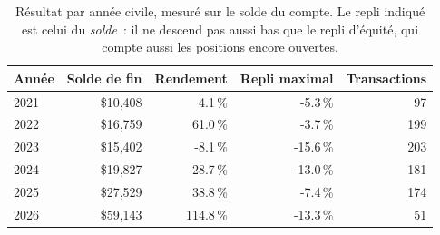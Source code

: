 \begin{table}[H]
\centering
\caption{Résultat par année civile, mesuré sur le solde du compte. Le repli indiqué est celui du \emph{solde}~: il ne descend pas aussi bas que le repli d'équité, qui compte aussi les positions encore ouvertes.}
\label{tab:mt5_yearly}
\begin{tabular}{lrrrr}
\toprule
Année & Solde de fin & Rendement & Repli maximal & Transactions \\
\midrule
2021 & \$10,408 & 4.1\,\% & -5.3\,\% & 97 \\
2022 & \$16,759 & 61.0\,\% & -3.7\,\% & 199 \\
2023 & \$15,402 & -8.1\,\% & -15.6\,\% & 203 \\
2024 & \$19,827 & 28.7\,\% & -13.0\,\% & 181 \\
2025 & \$27,529 & 38.8\,\% & -7.4\,\% & 174 \\
2026 & \$59,143 & 114.8\,\% & -13.3\,\% & 51 \\
\bottomrule
\end{tabular}
\end{table}
